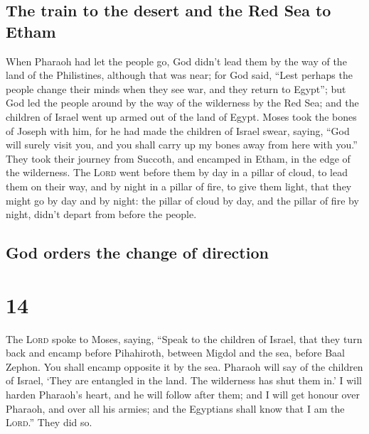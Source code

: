\hypertarget{the-train-to-the-desert-and-the-red-sea-to-etham}{%
\subsection{The train to the desert and the Red Sea to
Etham}\label{the-train-to-the-desert-and-the-red-sea-to-etham}}

 When Pharaoh had let the people go, God didn't lead them
by the way of the land of the Philistines, although that was near; for
God said, ``Lest perhaps the people change their minds when they see
war, and they return to Egypt'';  but God led the people
around by the way of the wilderness by the Red Sea; and the children of
Israel went up armed out of the land of Egypt.  Moses
took the bones of Joseph with him, for he had made the children of
Israel swear, saying, ``God will surely visit you, and you shall carry
up my bones away from here with you.''  They took their
journey from Succoth, and encamped in Etham, in the edge of the
wilderness.  The \textsc{Lord} went before them by day in
a pillar of cloud, to lead them on their way, and by night in a pillar
of fire, to give them light, that they might go by day and by night:
 the pillar of cloud by day, and the pillar of fire by
night, didn't depart from before the people.

\hypertarget{god-orders-the-change-of-direction}{%
\subsection{God orders the change of
direction}\label{god-orders-the-change-of-direction}}

\hypertarget{section-13}{%
\section{14}\label{section-13}}

 The \textsc{Lord} spoke to Moses, saying, 
``Speak to the children of Israel, that they turn back and encamp before
Pihahiroth, between Migdol and the sea, before Baal Zephon. You shall
encamp opposite it by the sea.  Pharaoh will say of the
children of Israel, `They are entangled in the land. The wilderness has
shut them in.'  I will harden Pharaoh's heart, and he will
follow after them; and I will get honour over Pharaoh, and over all his
armies; and the Egyptians shall know that I am the \textsc{Lord}.'' They
did so.

